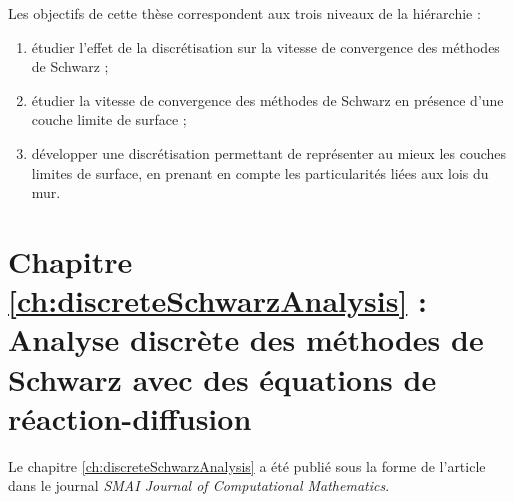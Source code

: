 Les objectifs de cette thèse correspondent aux trois niveaux de la
hiérarchie :
\begin{enumerate}
	\item étudier l'effet de la discrétisation sur la vitesse de
		convergence des méthodes de Schwarz ;
	\item étudier la vitesse de convergence des méthodes de
		Schwarz en présence d'une couche limite de surface ;
	\item développer une discrétisation permettant de représenter
		au mieux les couches limites de surface, en prenant
		en compte les particularités liées aux lois du mur.
\end{enumerate}
\section*{Chapitre \ref{ch:discreteSchwarzAnalysis} : Analyse discrète des méthodes de Schwarz avec des équations de réaction-diffusion}
Le chapitre \ref{ch:discreteSchwarzAnalysis} a été publié sous la forme de l'article
\citep{clement_discrete_2022-1} dans le journal
\textit{SMAI Journal of Computational Mathematics}.
